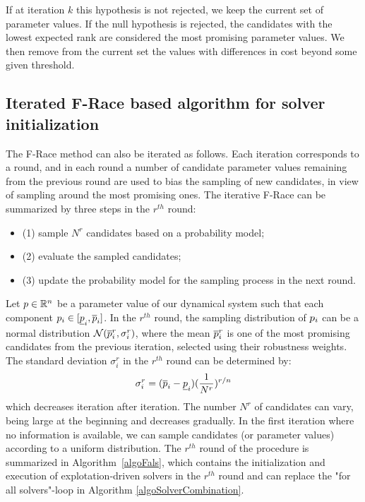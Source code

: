 If at iteration $k$ this hypothesis is not rejected, we keep the current set of parameter values. If the null hypothesis is rejected, the candidates with the lowest expected rank are considered the most promising parameter values. We then remove from the current set  the values with differences in cost beyond some given threshold.  
 
 \subsection{Iterated F-Race based algorithm for solver initialization}
The F-Race method can also be iterated as follows. Each iteration corresponds to a round, and in each round a number of candidate parameter values remaining from the previous round are used to bias the sampling of new candidates, in view of sampling around the most promising ones. The iterative F-Race can be summarized by three steps in the $r^{th}$ round: 
\begin{itemize}
\item (1) sample $N^r$ candidates based on a probability model; 
\item (2) evaluate the sampled candidates; 
\item (3) update the probability model for the sampling process in the next round.
\end{itemize}
Let $p \in \mathbb{R}^n$ be a parameter value of our dynamical system such that each component $p_i \in [\underline{p}_i, \overline{p}_i]$. In the $r^{th}$ round, the sampling distribution of $p_i$ can be a normal distribution $\mathcal{N}(\overline{p}^r_i, \sigma_i^r)$, where the mean $\overline{p}^r_i$ is one of the most promising candidates from the previous iteration, selected using their robustness weights. The standard deviation $\sigma_i^r$ in the $r^{th}$ round can be determined by: 
\begin{equation} \label{eq:sigma}
\sigma_i^r = (\overline{p}_i - \underline{p}_i) (\frac{1}{N^r})^{r/n}
\end{equation}
which decreases iteration after iteration. The number $N^r$ of candidates can vary, being large at the beginning and decreases gradually. In the first iteration where no information is available, we can sample candidates (or parameter values) according to a uniform distribution. The $r^{th}$ round of the procedure is summarized in Algorithm~\ref{algoFals}, which contains the initialization and execution of explotation-driven solvers in the $r^{th} $ round and can replace the "for all solvers"-loop in Algorithm \ref{algoSolverCombination}. 

